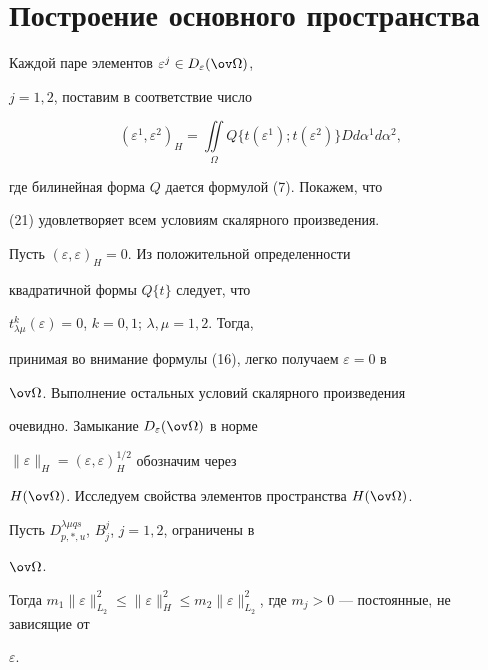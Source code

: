  


\section{Построение основного пространства} 


 


Каждой паре элементов $\varepsilon^j\in D_\varepsilon(\ov\Omega)$, 


$j=1,2$, поставим в соответствие число 


\begin{equation} 


(\varepsilon^1,\varepsilon^2)_H=\iint\limits_\Omega 


Q\{t(\varepsilon^1);t(\varepsilon^2)\}D d\alpha^1d\alpha^2, 


\end{equation} 


где билинейная форма $Q$ дается формулой (7). Покажем, что 


(21) удовлетворяет всем условиям скалярного произведения. 


Пусть $(\varepsilon,\varepsilon)_H=0$. Из положительной определенности 


квадратичной формы $Q\{t\}$ следует, что 


$t^k_{\lambda\mu}(\varepsilon)=0$, $k=0,1$; $\lambda,\mu=1,2$. Тогда, 


принимая во внимание формулы (16), легко получаем $\varepsilon=0$ в 


$\ov\Omega$. Выполнение остальных условий скалярного произведения 


очевидно. Замыкание $D_\varepsilon(\ov\Omega)$ в норме 


$\|\varepsilon\|_H=(\varepsilon,\varepsilon)^{1/2}_H$ обозначим через 


$H(\ov\Omega)$. Исследуем свойства элементов пространства $H(\ov\Omega)$. 


 


\begin{thm} 


Пусть $D^{\lambda\mu q s}_{p,\ast,u}$, $B^j_j$, $j=1,2$, ограничены в 


$\ov\Omega$. 


Тогда $m_1\|\varepsilon\|^2_{L_2}\le \|\varepsilon\|^2_H\le 


m_2\|\varepsilon\|^2_{L_2}$, где $m_j>0$ --- постоянные, не зависящие от 


$\varepsilon$. 


\end{thm} 


